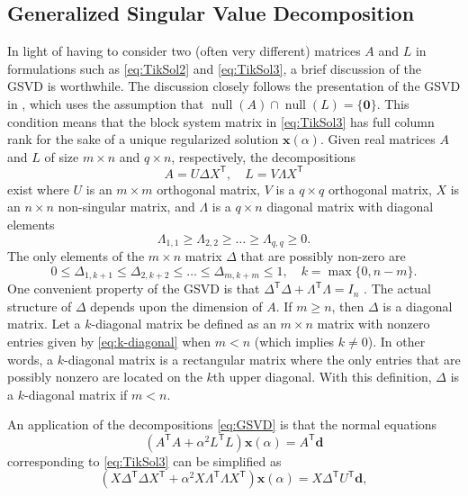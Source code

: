 \documentclass[12pt]{article}
\newcommand{\mA}{m}	%
\newcommand{\mL}{q}	%
\newcommand{\dVec}{\mathbf{d}}	%
\newcommand{\xVec}{\mathbf{x}}	%
\newcommand{\trans}[1]{{#1}^\mathsf{T}}	%
\DeclareMathOperator{\nullspace}{null}	%
\newcommand{\regparam}{\alpha}  %
\newcommand{\zeroVec}{\bm{0}}	%
\begin{document}
\subsection{Generalized Singular Value Decomposition} \label{sec:GSVD}
In light of having to consider two (often very different) matrices $A$ and $L$ in formulations such as \eqref{eq:TikSol2} and \eqref{eq:TikSol3}, a brief discussion of the GSVD is worthwhile. The discussion closely follows the presentation of the GSVD in \cite{ABT}, which uses the assumption that $\nullspace(A) \cap \nullspace(L) = \{\zeroVec\}$. This condition means that the block system matrix in \eqref{eq:TikSol3} has full column rank for the sake of a unique regularized solution $\xVec(\regparam)$. Given real matrices $A$ and $L$ of size $\mA \times n$ and $\mL \times n$, respectively, the decompositions
\begin{equation}
\label{eq:GSVD}
A = U\Delta\trans{X}, \quad L = V\Lambda\trans{X}
\end{equation}
exist where $U$ is an $\mA \times \mA$ orthogonal matrix, $V$ is a $\mL \times \mL$ orthogonal matrix, $X$ is an $n \times n$ non-singular matrix, and $\Lambda$ is a $\mL \times n$ diagonal matrix with diagonal elements
\[\Lambda_{1,1} \geq \Lambda_{2,2} \geq \ldots \geq \Lambda_{\mL,\mL} \geq 0.\]
The only elements of the $\mA \times n$ matrix $\Delta$ that are possibly non-zero are
\begin{equation}
\label{eq:k-diagonal}
 0 \leq \Delta_{1,k+1} \leq \Delta_{2,k+2} \leq \ldots \leq \Delta_{\mA,k+\mA} \leq 1, \quad k = \max \{0,n - \mA\}.
\end{equation}
One convenient property of the GSVD is that $\trans{\Delta}\Delta + \trans{\Lambda}\Lambda = I_n$ \cite[p.~104]{ABT}. The actual structure of $\Delta$ depends upon the dimension of $A$. If $\mA \geq n$, then $\Delta$ is a diagonal matrix. Let a $k$-diagonal matrix be defined as an $\mA \times n$ matrix with nonzero entries given by \eqref{eq:k-diagonal} when $\mA < n$ (which implies $k \neq 0$). In other words, a $k$-diagonal matrix is a rectangular matrix where the only entries that are possibly nonzero are located on the $k$th upper diagonal. With this definition, $\Delta$ is a $k$-diagonal matrix if $\mA < n$. \par 
An application of the decompositions \eqref{eq:GSVD} is that the normal equations 
\[(\trans{A}A + \regparam^2 \trans{L}L)\xVec(\regparam) = \trans{A}\dVec\] corresponding to \eqref{eq:TikSol3} can be simplified as 
\[(X\trans{\Delta}\Delta\trans{X} + \regparam^2 X\trans{\Lambda}\Lambda\trans{X})\xVec(\regparam) = X\trans{\Delta}\trans{U}\dVec,\]
\end{document}
